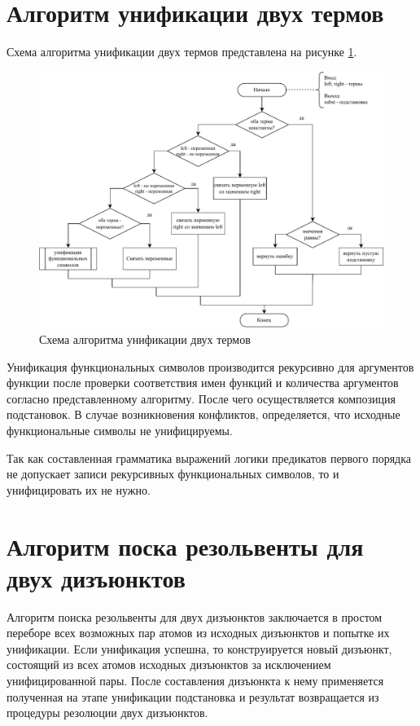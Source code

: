 \clearpage

\section{Алгоритм унификации двух термов}

Схема алгоритма унификации двух термов представлена на рисунке \ref{fig:unify-term}.

\begin{figure}[h!]
    \includegraphics[width=\linewidth]{unify-term.pdf}
    \caption{Схема алгоритма унификации двух термов}
    \label{fig:unify-term}
\end{figure}

Унификация функциональных символов производится рекурсивно для аргументов функции после проверки соответствия имен функций и количества аргументов согласно представленному алгоритму. После чего осуществляется композиция подстановок. В случае возникновения конфликтов, определяется, что исходные функциональные символы не унифицируемы.

Так как составленная грамматика выражений логики предикатов первого порядка не допускает записи рекурсивных функциональных символов, то и унифицировать их не нужно.

\section{Алгоритм поска резольвенты для двух дизъюнктов}

Алгоритм поиска резольвенты для двух дизъюнктов заключается в простом переборе всех возможных пар атомов из исходных дизъюнктов и попытке их унификации. Если унификация успешна, то конструируется новый дизъюнкт, состоящий из всех атомов исходных дизъюнктов за исключением унифицированной пары. После составления дизъюнкта к нему применяется полученная на этапе унификации подстановка и результат возвращается из процедуры резолюции двух дизъюнктов.

